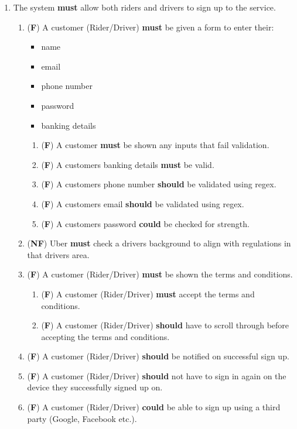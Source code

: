 \documentclass{article}
\begin{document}
\begin{enumerate}
      \vspace{.5cm}
      \item The system \textbf{must} allow both riders and drivers to sign up to the service.
      \begin{enumerate}[label=3.\arabic{*}]
        \item (\textbf{F}) A customer (Rider/Driver) \textbf{must} be given a form to enter their:
        \begin{itemize}
          \item name
          \item email
          \item phone number
          \item password
          \item banking details
        \end{itemize}
        \begin{enumerate}[label=3.1.\arabic{*}]
          \item (\textbf{F}) A customer \textbf{must} be shown any inputs that fail validation.
          \item (\textbf{F}) A customers banking details \textbf{must} be valid.
          \item (\textbf{F}) A customers phone number \textbf{should} be validated using regex.
          \item (\textbf{F}) A customers email \textbf{should} be validated using regex.
          \item (\textbf{F}) A customers password \textbf{could} be checked for strength.
        \end{enumerate}
        \item (\textbf{NF}) Uber \textbf{must} check a drivers background to align with regulations in that drivers area.
        \item (\textbf{F}) A customer (Rider/Driver) \textbf{must} be shown the terms and conditions.
        \begin{enumerate}[label=3.3.\arabic{*}]
          \item (\textbf{F}) A customer (Rider/Driver) \textbf{must} accept the terms and conditions.
          \item (\textbf{F}) A customer (Rider/Driver) \textbf{should} have to scroll through before accepting the terms and conditions.
        \end{enumerate}
        \item (\textbf{F}) A customer (Rider/Driver) \textbf{should} be notified on successful sign up.
        \item (\textbf{F}) A customer (Rider/Driver) \textbf{should} not have to sign in again on the device they successfully signed up on.
        \item (\textbf{F}) A customer (Rider/Driver) \textbf{could} be able to sign up using a third party (Google, Facebook etc.).
      \end{enumerate}


\end{enumerate}
\end{document}
